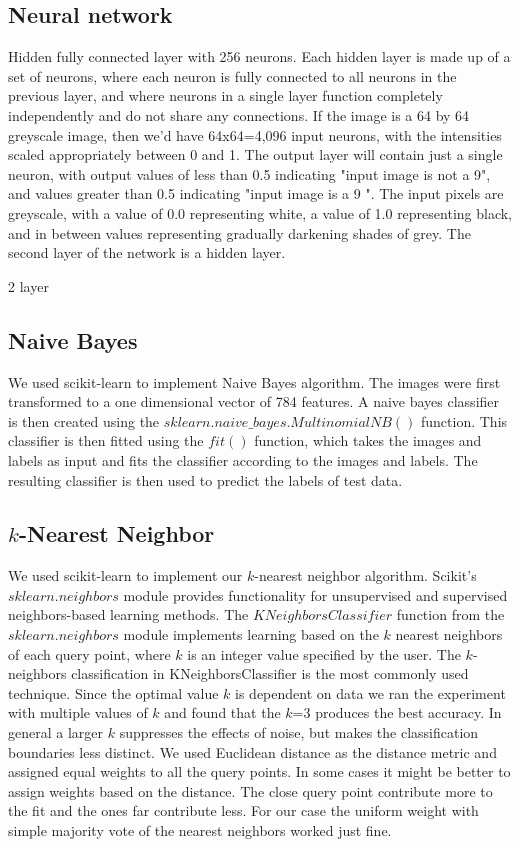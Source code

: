 \subsection{Neural network}



 Hidden fully connected layer with 256 neurons. Each hidden layer is made up of a set of neurons, where each neuron is fully connected to all neurons in the previous layer, and where neurons in a single layer function completely independently and do not share any connections. If the image is a 64 by 64 greyscale image, then we'd have 64x64=4,096 input neurons, with the intensities scaled appropriately between 0 and 1. The output layer will contain just a single neuron, with output values of less than 0.5 indicating "input image is not a 9", and values greater than 0.5 indicating "input image is a 9 ". The input pixels are greyscale, with a value of 0.0 representing white, a value of 1.0 representing black, and in between values representing gradually darkening shades of grey. The second layer of the network is a hidden layer.

2 layer


\subsection{Naive Bayes}
We used scikit-learn to implement Naive Bayes algorithm. The images were first transformed to a one dimensional vector of 784 features. 
A naive bayes classifier is then created using the $sklearn.naive\_bayes.MultinomialNB()$ function. This classifier is then fitted using the $fit()$ function, which takes the images and labels as input and fits the classifier according to the images and labels. The resulting classifier is then used to predict the labels of test data.

\subsection{$k$-Nearest Neighbor}
 We used scikit-learn to implement our $k$-nearest neighbor algorithm. Scikit's $sklearn.neighbors$ module provides functionality for unsupervised and supervised neighbors-based learning methods. 
 The $KNeighborsClassifier$ function from the $sklearn.neighbors$ module implements learning based on the $k$ nearest neighbors of each query point, where $k$ is an integer value specified by the user. The $k$-neighbors classification in KNeighborsClassifier is the most commonly used technique. Since the optimal value $k$ is dependent on data we ran the experiment with multiple values of $k$ and found that the $k$=3 produces the best accuracy. In general a larger $k$ suppresses the effects of noise, but makes the classification boundaries less distinct.
 We used Euclidean distance as the distance metric and assigned equal weights to all the query points. In some cases it might be better to assign weights based on the distance. The close query point contribute more to the fit and the ones far contribute less. For our case the uniform weight with simple majority vote of the nearest neighbors worked just fine.

